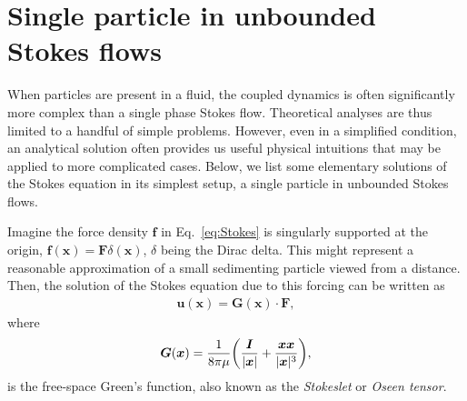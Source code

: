 \section{Single particle in unbounded Stokes flows}
\label{sec:single-p}

When particles are present in a fluid, the coupled dynamics is often significantly more complex than a single phase Stokes flow. Theoretical analyses are thus limited to a handful of simple problems. However, even in a simplified condition, an analytical solution often provides us useful physical intuitions that may be applied to more complicated cases. Below, we list some elementary solutions of the Stokes equation in its simplest setup, \ie a single particle in unbounded Stokes flows.

\bigskip
Imagine the force density ${\bm f}$ in Eq.\ \eqref{eq:Stokes} is singularly supported at the origin, \ie ${\bm f}({\bm x})={\bm F}\delta({\bm x})$, $\delta$ being the Dirac delta. This might represent a reasonable approximation of a small sedimenting particle viewed from a distance. Then, the solution of the Stokes equation due to this forcing can be written as
\begin{equation} \label{eq:stokes-green}
 \begin{aligned}
   {\bm u}({\bm x}) = {\bm G}({\bm x}) \cdot {\bm F},
 \end{aligned}
\end{equation}
where  
\begin{equation}
 \begin{aligned}
   {\bm G}({\bm x}) = \frac{1}{8\pi\mu } \bigg( \frac{{\bm I}}{\lvert\bm x\rvert}+\frac{ {\bm x}{\bm x} }{ \lvert{\bm x}\rvert^3 } \bigg),
 \end{aligned}
\end{equation}
is the free-space Green's function, also known as the \emph{Stokeslet} or \emph{Oseen tensor}.

